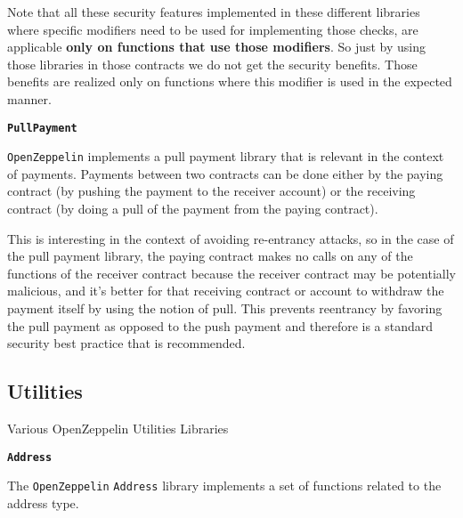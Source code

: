 Note that all these security features implemented in these different
libraries where specific modifiers need to be used for implementing
those checks, are applicable \textbf{only on functions that use those
modifiers}. So just by using those libraries in those contracts we do
not get the security benefits. Those benefits are realized only on
functions where this modifier is used in the expected manner.

\textbf{\texttt{PullPayment}}

\texttt{OpenZeppelin} implements a pull payment library that is relevant
in the context of payments. Payments between two contracts can be done
either by the paying contract (by pushing the payment to the receiver
account) or the receiving contract (by doing a pull of the payment from
the paying contract).

This is interesting in the context of avoiding re-entrancy attacks, so
in the case of the pull payment library, the paying contract makes no
calls on any of the functions of the receiver contract because the
receiver contract may be potentially malicious, and it's better for that
receiving contract or account to withdraw the payment itself by using
the notion of pull. This prevents reentrancy by favoring the pull
payment as opposed to the push payment and therefore is a standard
security best practice that is recommended.

\subsection{Utilities}\label{utilities}

Various OpenZeppelin Utilities Libraries

\textbf{\texttt{Address}}

The \texttt{OpenZeppelin} \texttt{Address} library implements a set of
functions related to the address type.

